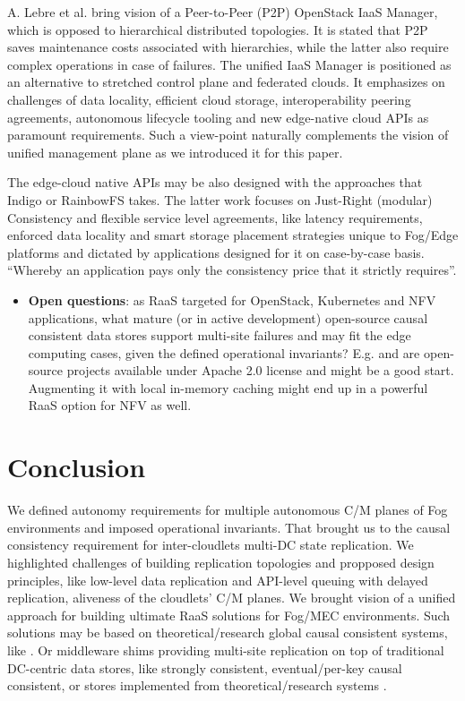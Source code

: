 \documentclass[conference]{IEEEtran}
\begin{document}
A. Lebre et al.\cite{b9} bring vision of a Peer-to-Peer (P2P) OpenStack IaaS
Manager, which is opposed to hierarchical distributed topologies. It is stated
that P2P saves maintenance costs associated with hierarchies, while the latter
also require complex operations in case of failures. The unified IaaS Manager
is positioned as an alternative to stretched control plane and federated
clouds. It emphasizes on challenges of data locality, efficient cloud storage,
interoperability peering agreements, autonomous lifecycle tooling and new
edge-native cloud APIs as paramount requirements. Such a view-point naturally
complements the vision of unified management plane as we introduced it for this
paper.

The edge-cloud native APIs may be also designed with the approaches that
Indigo\cite{b10} or RainbowFS\cite{b7} takes. The latter work focuses on
Just-Right (modular) Consistency and flexible service level agreements, like
latency requirements, enforced data locality and smart storage placement
strategies unique to Fog/Edge platforms and dictated by applications designed
for it on case-by-case basis. ``Whereby an application pays only the
consistency price that it strictly requires''\cite{b7}.

\begin{itemize}
  \item \textbf{Open questions}: as RaaS targeted for OpenStack, Kubernetes and
    NFV applications, what mature (or in active development) open-source causal
    consistent data stores support multi-site failures and may fit the edge
    computing cases, given the defined operational invariants? E.g.\cite{b12}
    \cite{b20} and \cite{b23} are open-source projects available under
    Apache 2.0 license and might be a good start. Augmenting it with local
    in-memory caching might end up in a powerful RaaS option for NFV as well.
\end{itemize}

\section{Conclusion}
We defined autonomy requirements for multiple autonomous C/M planes of Fog
environments and imposed operational invariants. That brought us to the causal
consistency requirement for inter-cloudlets multi-DC state replication. We
highlighted challenges of building replication topologies and propposed design
principles, like low-level data replication and API-level queuing with delayed
replication, aliveness of the cloudlets' C/M planes. We brought vision of a
unified approach for building ultimate RaaS solutions for Fog/MEC environments.
Such solutions may be based on theoretical/research global causal consistent
systems, like \cite{b11}\cite{b12}. Or middleware shims providing multi-site
replication on top of traditional DC-centric data stores, like strongly
consistent\cite{b22}, eventual/per-key causal consistent\cite{b19}\cite{b20},
or stores implemented from theoretical/research systems
\cite{b1}\cite{b2}\cite{b7}\cite{b10}\cite{b13}\cite{b23}.
\end{document}
